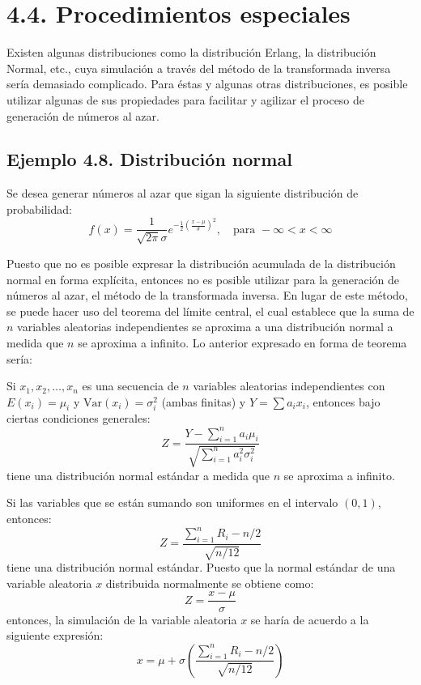 \documentclass[11pt,letterpaper]{report}
\begin{document}
\section*{4.4. Procedimientos especiales}

Existen algunas distribuciones como la distribución Erlang, la distribución Normal, etc., cuya simulación a través del método de la transformada inversa sería demasiado complicado. Para éstas y algunas otras distribuciones, es posible utilizar algunas de sus propiedades para facilitar y agilizar el proceso de generación de números al azar.

\subsection*{Ejemplo 4.8. Distribución normal}
Se desea generar números al azar que sigan la siguiente distribución de probabilidad:
\begin{equation}
f(x) = \frac{1}{\sqrt{2\pi}\sigma} e^{-\frac{1}{2}\left(\frac{x - \mu}{\sigma}\right)^2}, \quad \text{para } -\infty < x < \infty
\end{equation}

Puesto que no es posible expresar la distribución acumulada de la distribución normal en forma explícita, entonces no es posible utilizar para la generación de números al azar, el método de la transformada inversa. En lugar de este método, se puede hacer uso del teorema del límite central, el cual establece que la suma de $n$ variables aleatorias independientes se aproxima a una distribución normal a medida que $n$ se aproxima a infinito. Lo anterior expresado en forma de teorema sería:

Si $x_1, x_2, \dots, x_n$ es una secuencia de $n$ variables aleatorias independientes con $E(x_i) = \mu_i$ y $\text{Var}(x_i) = \sigma_i^2$ (ambas finitas) y $Y = \sum a_i x_i$, entonces bajo ciertas condiciones generales:
\begin{equation}
Z = \frac{Y - \sum_{i=1}^n a_i \mu_i}{\sqrt{\sum_{i=1}^n a_i^2 \sigma_i^2}}
\end{equation}
tiene una distribución normal estándar a medida que $n$ se aproxima a infinito.

Si las variables que se están sumando son uniformes en el intervalo $(0, 1)$, entonces:
\begin{equation}
Z = \frac{\sum_{i=1}^n R_i - n/2}{\sqrt{n/12}}
\end{equation}
tiene una distribución normal estándar. Puesto que la normal estándar de una variable aleatoria $x$ distribuida normalmente se obtiene como:
\begin{equation}
Z = \frac{x - \mu}{\sigma}
\end{equation}
entonces, la simulación de la variable aleatoria $x$ se haría de acuerdo a la siguiente expresión:
\begin{equation}
x = \mu + \sigma \left( \frac{\sum_{i=1}^n R_i - n/2}{\sqrt{n/12}} \right)
\end{equation}
\end{document}
